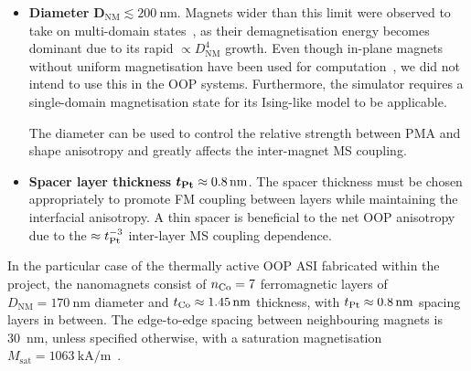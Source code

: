 \begin{itemize}
	\item \textbf{Diameter} $\boldsymbol{D_\mathrm{NM}} \lesssim \SI{200}{\nano\metre}$. \newline
	Magnets wider than this limit were observed to take on multi-domain states~\cite{KUR-24}, as their demagnetisation energy becomes dominant due to its rapid $\propto D_\mathrm{NM}^4$ growth.
	Even though in-plane magnets without uniform magnetisation have been used for computation~\cite{gartside2022reconfigurable}, we did not intend to use this in the OOP systems.
	Furthermore, the \hotspice simulator requires a single-domain magnetisation state for its Ising-like model to be applicable. \par
	The diameter can be used to control the relative strength between PMA and shape anisotropy and greatly affects the inter-magnet MS coupling.
	\item \textbf{Spacer layer thickness} $\boldsymbol{t_{\ce{Pt}}} \approx \SI{0.8}{\nano\metre}$. \newline
	The spacer thickness must be chosen appropriately to promote FM coupling between layers while maintaining the interfacial anisotropy. %
	A thin spacer is beneficial to the net OOP anisotropy due to the $\approx t_{\ce{Pt}}^{-3}$ inter-layer MS coupling dependence.
\end{itemize}

In the particular case of the thermally active OOP ASI fabricated within the \spinengine project, the nanomagnets consist of $n_{\ce{Co}}=7$ ferromagnetic layers of $D_\mathrm{NM}=\SI{170}{\nano\metre}$ diameter and $t_{\ce{Co}} \approx \SI{1.45}{\nano\metre}$ thickness, with $t_{\ce{Pt}} \approx \SI{0.8}{\nano\metre}$ spacing layers in between.
The edge-to-edge spacing between neighbouring magnets is \SI{30}{\nano\metre}, unless specified otherwise, with a saturation magnetisation $M_\mathrm{sat}=\SI{1063}{\kilo\ampere\per\metre}$~\cite{Msat_Co}.

